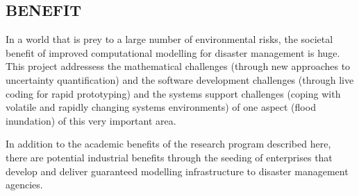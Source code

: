\subsection*{BENEFIT}

In a world that is prey to a large number of environmental risks,
the societal benefit of improved computational modelling for disaster management is huge.
This project addressess the mathematical challenges (through new approaches
to uncertainty quantification) and the software development challenges (through live coding
 for rapid prototyping) and the systems support challenges (coping with volatile and 
 rapidly changing systems environments) of one aspect (flood inundation) of this very important area.
 
 In addition to the academic benefits of the research program described here, there are potential industrial benefits
 through the seeding of enterprises that develop and deliver guaranteed modelling infrastructure to disaster management
 agencies.

\iffalse
This research is aims to unlock the power of sophisticated
computational simulation incorporating uncertainty for
\emph{interactive} use.  Although we concentrate our research on
simulation support for disaster response, the ultimate potential of
this work is to eventually empower domain experts from a broad range
of areas to better use the high-performance computing power which is
now available to them. We envision a future where performing a complex
flood model or disaster simulation is as interactive and \emph{alive}
as flicking through photos on a tablet.\\



There are several benefits arising from the successful completion of
this project. They include, economic, societal as well as
environmental along with the generation of new knowledge:
\begin{itemize}
\item Reduced economic losses from disasters such as flooding
\item Reduced property damage from disasters
\item Reduced loss of life from disasters
\item New knowledge in the understanding of disaster modelling, and
  hence forecasting.
\end{itemize}
\fi